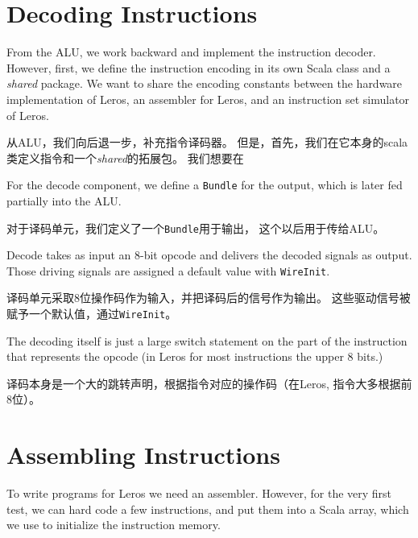 \documentclass[%
    10pt,
    headinclude, footexclude,
    openright, %
    notitlepage,
    cleardoubleempty,
    headsepline,
    pointlessnumbers,
    bibtotoc, idxtotoc,
    ]{scrbook}
\newcommand{\code}[1]{{\small{\texttt{#1}}}}
\newcommand{\todo}[1]{{\emph{TODO: #1}}}
\renewcommand{\todo}[1]{}
\begin{document}
\section{Decoding Instructions}

From the ALU, we work backward and implement the instruction decoder.
However, first, we define the instruction encoding in its own Scala class and
a \emph{shared} package. We want to share the encoding constants between
the hardware implementation of Leros, an assembler for Leros, and an instruction
set simulator of Leros.

从ALU，我们向后退一步，补充指令译码器。
但是，首先，我们在它本身的scala类定义指令和一个\emph{shared}的拓展包。
我们想要在


\todo{Update code when Leros is more complete, as stuff is missing.}

\noindent For the decode component, we define a \code{Bundle} for the output,
which is later fed partially into the ALU.

\noindent 对于译码单元，我们定义了一个\code{Bundle}用于输出，
这个以后用于传给ALU。


\noindent Decode takes as input an 8-bit opcode and delivers the decoded signals
as output. Those driving signals are assigned a default value with \code{WireInit}.

\noindent 译码单元采取8位操作码作为输入，并把译码后的信号作为输出。
这些驱动信号被赋予一个默认值，通过\code{WireInit}。


\noindent The decoding itself is just a large switch statement on the part of the
instruction that represents the opcode (in Leros for most instructions the upper
8 bits.)

\noindent 译码本身是一个大的跳转声明，根据指令对应的操作码（在Leros, 指令大多根据前8位）。


\section{Assembling Instructions}

To write programs for Leros we need an assembler. However, for the very first
test, we can hard code a few instructions, and put them into a Scala array,
which we use to initialize the instruction memory.
\end{document}
